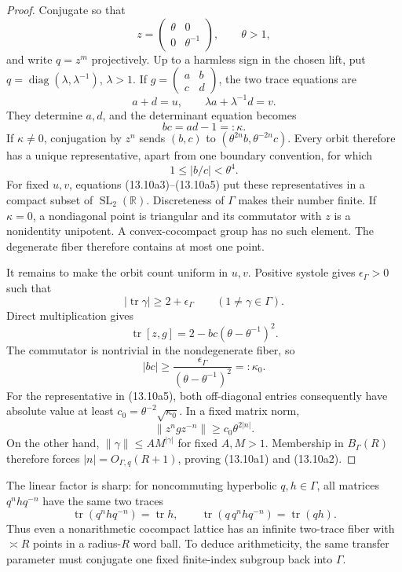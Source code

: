 \documentclass[11pt,reqno]{amsart}
\theoremstyle{definition}
\theoremstyle{remark}
\newcommand{\R}{\mathbb R}
\newcommand{\Tr}{\operatorname{tr}}
\newcommand{\SL}{\operatorname{SL}}
\newcommand{\diag}{\operatorname{diag}}
\begin{document}
\begin{proof}
Conjugate so that
\[
 z=\begin{pmatrix}\theta&0\\0&\theta^{-1}\end{pmatrix},
 \qquad \theta>1,
\]
and write \(q=z^m\) projectively.  Up to a harmless sign in the chosen
lift, put \(q=\diag(\lambda,\lambda^{-1})\), \(\lambda>1\).  If
\(g=(\begin{smallmatrix}a&b\\c&d\end{smallmatrix})\), the two trace
equations are
\[
 a+d=u,\qquad \lambda a+\lambda^{-1}d=v.
\tag{13.10a3}
\]
They determine \(a,d\), and the determinant equation becomes
\[
 bc=ad-1=:\kappa.
\tag{13.10a4}
\]
If \(\kappa\ne0\), conjugation by \(z^n\) sends
\((b,c)\) to \((\theta^{2n}b,\theta^{-2n}c)\).  Every orbit therefore
has a unique representative, apart from one boundary convention, for which
\[
 1\le |b/c|<\theta^4.
\tag{13.10a5}
\]
For fixed \(u,v\), equations (13.10a3)--(13.10a5) put these representatives
in a compact subset of \(\SL_2(\R)\).  Discreteness of \(\Gamma\) makes
their number finite.  If \(\kappa=0\), a nondiagonal point is triangular
and its commutator with \(z\) is a nonidentity unipotent.  A convex-cocompact
group has no such element.  The degenerate fiber therefore contains at most
one point.

It remains to make the orbit count uniform in \(u,v\).  Positive systole
gives \(\epsilon_\Gamma>0\) such that
\[
 |\Tr\gamma|\ge2+\epsilon_\Gamma
 \qquad(1\ne\gamma\in\Gamma).
\]
Direct multiplication gives
\[
 \Tr[z,g]=2-bc(\theta-\theta^{-1})^2.
\tag{13.10a6}
\]
The commutator is nontrivial in the nondegenerate fiber, so
\[
 |bc|\ge
 \frac{\epsilon_\Gamma}{(\theta-\theta^{-1})^2}=:\kappa_0.
\tag{13.10a7}
\]
For the representative in (13.10a5), both off-diagonal entries consequently
have absolute value at least \(c_0=\theta^{-2}\sqrt{\kappa_0}\).  In a
fixed matrix norm,
\[
 \|z^ngz^{-n}\|\ge c_0\theta^{2|n|}.
\]
On the other hand, \(\|\gamma\|\le AM^{|\gamma|}\) for fixed
\(A,M>1\).  Membership in \(B_\Gamma(R)\) therefore forces
\(|n|=O_{\Gamma,q}(R+1)\), proving (13.10a1) and (13.10a2).
\end{proof}

The linear factor is sharp: for noncommuting hyperbolic \(q,h\in\Gamma\),
all matrices \(q^nhq^{-n}\) have the same two traces
\[
 \Tr(q^nhq^{-n})=\Tr h,
 \qquad
 \Tr(q\,q^nhq^{-n})=\Tr(qh).
\]
Thus even a nonarithmetic cocompact lattice has an infinite two-trace fiber
with \(\asymp R\) points in a radius-\(R\) word ball.  To deduce
arithmeticity, the same transfer parameter must conjugate one fixed
finite-index subgroup back into \(\Gamma\).
\end{document}
